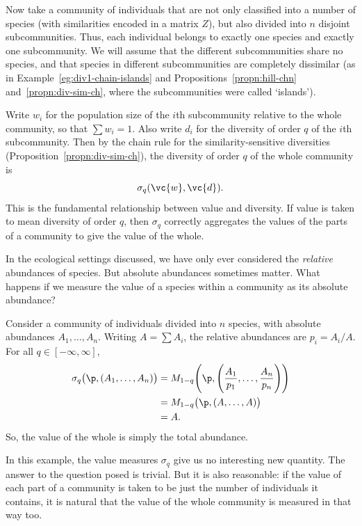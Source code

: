 \begin{example}
%
Now take a community of individuals that are not only classified into a
number of species (with similarities encoded in a matrix $Z$), but
also divided into $n$ disjoint subcommunities.  Thus, each individual
belongs to exactly one species and exactly one subcommunity.  We will
assume that the different subcommunities share no species, and that species
in different subcommunities are completely dissimilar (as in
Example~\ref{eg:div1-chain-islands} and Propositions~\ref{propn:hill-chn}
and~\ref{propn:div-sim-ch}, where the subcommunities were called
`islands').%
%

Write $w_i$ for the population size of the $i$th subcommunity relative to
the whole community, so that $\sum w_i = 1$.  Also write $d_i$ for the
diversity of order $q$ of the $i$th subcommunity.  Then by the chain rule
for the similarity-sensitive diversities
(Proposition~\ref{propn:div-sim-ch}), the diversity of order $q$ of the
whole community is
\[
\sigma_q(\vc{w}, \vc{d}).
\]
This is the fundamental relationship%
%
%
% 
between value and diversity.  If value is taken to mean diversity of order
$q$, then $\sigma_q$ correctly aggregates the values of the parts of a
community to give the value of the whole.
\end{example}

\begin{example}
In the ecological settings discussed, we have only ever considered the
\emph{relative} abundances of species.  But absolute%
%
%
abundances sometimes matter.  What happens if we measure the value of a
species within a community as its absolute abundance?

Consider a community of individuals divided into $n$ species, with absolute
abundances $A_1, \ldots, A_n$.  Writing $A = \sum A_i$, the relative
abundances are $p_i = A_i/A$.  For all $q \in [-\infty, \infty]$,
% 
\begin{align*}
\sigma_q\bigl(\p, (A_1, \ldots, A_n)\bigr)      &
=
M_{1 - q}\Biggl( 
\p, \Biggl(\frac{A_1}{p_1}, \ldots, \frac{A_n}{p_n}\Biggr) 
\Biggr)  \\
&
=
M_{1 - q}\bigl( \p, (A, \ldots, A) \bigr)       \\
&
=
A.
\end{align*}
% 
So, the value of the whole is simply the total abundance.

In this example, the value measures $\sigma_q$ give us no interesting new
quantity.  The answer to the question posed is trivial.  But it is also
reasonable: if the value of each part of a community is taken to be just
the number of individuals it contains, it is natural that the value of the
whole community is measured in that way too.
\end{example}

